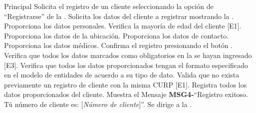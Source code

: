 	\begin{UCtrayectoria}{Principal}
		\UCpaso[\UCactor] Solicita el registro de un cliente seleccionando la opción de ``Registrarse'' de la .
		\UCpaso Solicita los datos del cliente a registrar mostrando la .
		\UCpaso[\UCactor] Proporciona los datos personales.
		\UCpaso Verifica la mayoría de edad del cliente [E1].
		\UCpaso[\UCactor] Proporciona los datos de la ubicación.
		\UCpaso[\UCactor] Proporciona los datos de contacto.
		\UCpaso[\UCactor] Proporciona los datos médicos.
		\UCpaso[\UCactor] Confirma el registro presionando el botón .
		\UCpaso Verifica que todos los datos marcados como obligatorios en la  se hayan ingresado [E3].
		\UCpaso Verifica que todos los datos proporcionados tengan el formato especificado en el modelo de entidades de acuerdo a su tipo de dato.
		\UCpaso Valida que no exista previamente un registro de cliente con la misma CURP [E1].
		\UCpaso Registra todos los datos proporcionados del cliente.
		\UCpaso Muestra el Mensaje {\bf MSG4-}``Registro exitoso. Tú número de cliente es: [{\em Número de cliente}]''.
		\UCpaso Se dirige a la .
		
	\end{UCtrayectoria}
	

		

	